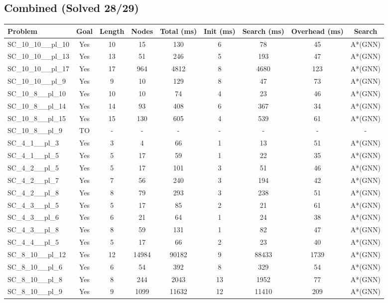 \documentclass{article}
\begin{document}
\subsection*{Combined (Solved 28/29)}
\begin{tabular}{lcccccccc}
\toprule
Problem & Goal & Length & Nodes & Total (ms) & Init (ms) & Search (ms) & Overhead (ms) & Search \\
\midrule
SC\_10\_10\_\_pl\_10 & Yes & 10 & 15 & 130 & 6 & 78 & 45 & A*(GNN) \\
SC\_10\_10\_\_pl\_13 & Yes & 13 & 51 & 246 & 5 & 193 & 47 & A*(GNN) \\
SC\_10\_10\_\_pl\_17 & Yes & 17 & 964 & 4812 & 8 & 4680 & 123 & A*(GNN) \\
SC\_10\_10\_\_pl\_9 & Yes & 9 & 10 & 129 & 8 & 47 & 73 & A*(GNN) \\
SC\_10\_8\_\_pl\_10 & Yes & 10 & 10 & 74 & 4 & 23 & 46 & A*(GNN) \\
SC\_10\_8\_\_pl\_14 & Yes & 14 & 93 & 408 & 6 & 367 & 34 & A*(GNN) \\
SC\_10\_8\_\_pl\_15 & Yes & 15 & 130 & 605 & 4 & 539 & 61 & A*(GNN) \\
SC\_10\_8\_\_pl\_9 & TO & - & - & - & - & - & - & - \\
SC\_4\_1\_\_pl\_3 & Yes & 3 & 4 & 66 & 1 & 13 & 51 & A*(GNN) \\
SC\_4\_1\_\_pl\_5 & Yes & 5 & 17 & 59 & 1 & 22 & 35 & A*(GNN) \\
SC\_4\_2\_\_pl\_5 & Yes & 5 & 17 & 101 & 3 & 51 & 46 & A*(GNN) \\
SC\_4\_2\_\_pl\_7 & Yes & 7 & 56 & 240 & 3 & 194 & 42 & A*(GNN) \\
SC\_4\_2\_\_pl\_8 & Yes & 8 & 79 & 293 & 3 & 238 & 51 & A*(GNN) \\
SC\_4\_3\_\_pl\_5 & Yes & 5 & 17 & 85 & 2 & 21 & 61 & A*(GNN) \\
SC\_4\_3\_\_pl\_6 & Yes & 6 & 21 & 64 & 1 & 24 & 38 & A*(GNN) \\
SC\_4\_3\_\_pl\_8 & Yes & 8 & 59 & 131 & 1 & 82 & 47 & A*(GNN) \\
SC\_4\_4\_\_pl\_5 & Yes & 5 & 17 & 66 & 2 & 23 & 40 & A*(GNN) \\
SC\_8\_10\_\_pl\_12 & Yes & 12 & 14984 & 90182 & 9 & 88433 & 1739 & A*(GNN) \\
SC\_8\_10\_\_pl\_6 & Yes & 6 & 54 & 392 & 8 & 329 & 54 & A*(GNN) \\
SC\_8\_10\_\_pl\_8 & Yes & 8 & 244 & 2043 & 13 & 1952 & 77 & A*(GNN) \\
SC\_8\_10\_\_pl\_9 & Yes & 9 & 1099 & 11632 & 12 & 11410 & 209 & A*(GNN) \\

\end{tabular}
\end{document}
